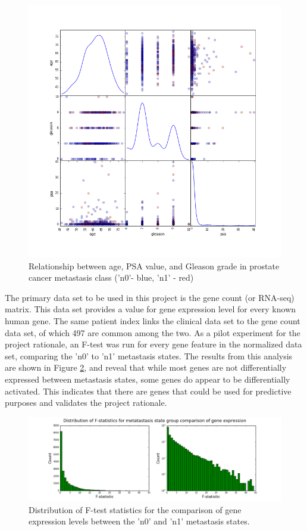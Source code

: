 \documentclass[final]{article}
\begin{document}
\begin{figure}
  \centering
  \includegraphics[scale=0.33]{ClinScatterMatrix}
  \caption{Relationship between age, PSA value, and Gleason grade in prostate cancer metastasis class ('n0'- blue, 'n1' - red)\label{fig:ClinSM}}
\end{figure}

The primary data set to be used in this project is the gene count (or RNA-seq)
matrix.  This data set provides a value for gene expression level for every
known human gene. The same patient index links the clinical data set to the
gene count data set, of which 497 are common among the two.  As a pilot
experiment for the project rationale, an F-test was run for every gene feature
in the normalized data set, comparing the 'n0' to 'n1' metastasis states.  The
results from this analysis are  shown in Figure \ref{fig:FDist}, and reveal that
while most genes are not differentially expressed between metastasis states,
some genes do appear to be differentially activated. This indicates that there
are genes that could be used for predictive purposes and validates the project
rationale.

\begin{figure}[h]
  \centering
  \includegraphics[width = \textwidth]{FDist}
  \caption{Distribution of F-test statistics for the comparison of gene expression levels between the 'n0' and 'n1' metastasis states.\label{fig:FDist}}
\end{figure}
\end{document}
